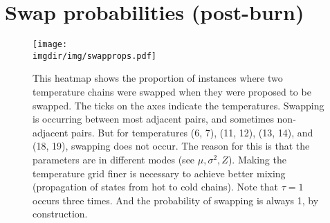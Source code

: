 \documentclass[10pt]{article} %
\def\imgdir{../../results/test-sim-6-7-5/maxtemp1.05-ntemps20-degree1-N2000}
\begin{document}
\section{Swap probabilities (post-burn)}
\begin{figure}[H]
  \centering
  \texttt{[image: \\imgdir/img/swapprops.pdf]}
  \caption{This heatmap shows the proportion of instances where two
  temperature chains were swapped when they were proposed to be swapped. The
  ticks on the axes indicate the temperatures. Swapping is occurring between
  most adjacent pairs, and sometimes non-adjacent pairs. But for temperatures
  (6, 7), (11, 12), (13, 14), and (18, 19), swapping does not occur. The reason
  for this is that the parameters are in different modes (see $\mu, \sigma^2,
  Z$). Making the temperature grid finer is necessary to achieve better mixing
  (propagation of states from hot to cold chains). Note that $\tau=1$ occurs
  three times. And the probability of swapping is always 1, by construction.}
\end{figure}

\newpage
\end{document}
